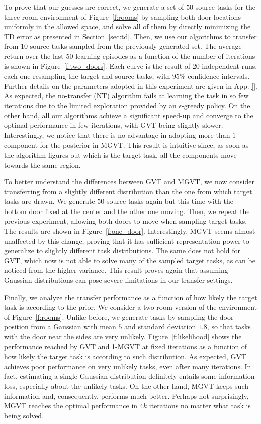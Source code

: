 \documentclass{article}
\begin{document}
To prove that our guesses are correct, we generate a set of $50$ source tasks for the three-room environment of Figure~\ref{f:rooms} by sampling both door locations uniformly in the allowed space, and solve all of them by directly minimizing the TD error as presented in Section~\ref{sec:td}. Then, we use our algorithms to transfer from $10$ source tasks sampled from the previously generated set. The average return over the last $50$ learning episodes as a function of the number of iterations is shown in Figure~\ref{f:two_doors}. Each curve is the result of $20$ independent runs, each one resampling the target and source tasks, with $95\%$ confidence intervals. Further details on the parameters adopted in this experiment are given in App. \ref{}. As expected, the no-transfer (NT) algorithm fails at learning the task in so few iterations due to the limited exploration provided by an $\epsilon$-greedy policy. On the other hand, all our algorithms achieve a significant speed-up and converge to the optimal performance in few iterations, with GVT being slightly slower. Interestingly, we notice that there is no advantage in adopting more than $1$ component for the posterior in MGVT. This result is intuitive since, as soon as the algorithm figures out which is the target task, all the components move towards the same region.

To better understand the differences between GVT and MGVT, we now consider transferring from a slightly different distribution than the one from which target tasks are drawn. We generate $50$ source tasks again but this time with the bottom door fixed at the center and the other one moving. Then, we repeat the previous experiment, allowing both doors to move when sampling target tasks. The results are shown in Figure~\ref{f:one_door}. Interestingly, MGVT seems almost unaffected by this change, proving that it has sufficient representation power to generalize to slightly different task distributions. The same does not hold for GVT, which now is not able to solve many of the sampled target tasks, as can be noticed from the higher variance. This result proves again that assuming Gaussian distributions can pose severe limitations in our transfer settings.

Finally, we analyze the transfer performance as a function of how likely the target task is according to the prior. We consider a two-room version of the environment of Figure~\ref{f:rooms}. Unlike before, we generate tasks by sampling the door position from a Gaussian with mean $5$ and standard deviation $1.8$, so that tasks with the door near the sides are very unlikely. Figure~\ref{f:likelihood} shows the performance reached by GVT and 1-MGVT at fixed iterations as a function of how likely the target task is according to such distribution. As expected, GVT achieves poor performance on very unlikely tasks, even after many iterations. In fact, estimating a single Gaussian distribution definitely entails some information loss, especially about the unlikely tasks. On the other hand, MGVT keeps such information and, consequently, performs much better. Perhaps not surprisingly, MGVT reaches the optimal performance in $4k$ iterations no matter what task is being solved.
\end{document}
